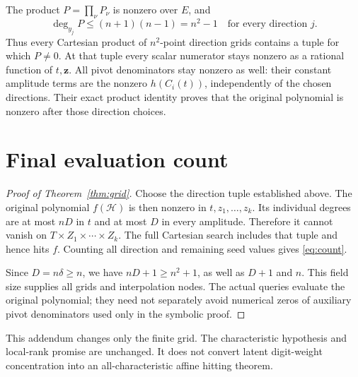 \documentclass[11pt]{article}
\begin{document}
The product \(P=\prod_\nu P_\nu\) is nonzero over \(E\), and
\[
 \deg_{y_j}P\le(n+1)(n-1)=n^2-1
 \quad\text{for every direction }j.
\]
Thus every Cartesian product of \(n^2\)-point direction grids
contains a tuple for which \(P\ne0\).
At that tuple every scalar numerator stays nonzero as a rational
function of \(t,\boldsymbol z\).
All pivot denominators stay nonzero as well: their constant
amplitude terms are the nonzero \(h(C_i(t))\), independently
of the chosen directions.
Their exact product identity proves that the original polynomial
is nonzero after those direction choices.

\section{Final evaluation count}

\begin{proof}[Proof of Theorem~\ref{thm:grid}]
Choose the direction tuple established above.
The original polynomial \(f(\mathcal H)\) is then nonzero in
\(t,z_1,\ldots,z_k\).
Its individual degrees are at most \(nD\) in \(t\) and at most
\(D\) in every amplitude. Therefore it cannot vanish on
\(T\times Z_1\times\cdots\times Z_k\).
The full Cartesian search includes that tuple and hence hits \(f\).
Counting all direction and remaining seed values gives
\eqref{eq:count}.

Since \(D=n\delta\ge n\), we have \(nD+1\ge n^2+1\), as well
as \(D+1\) and \(n\). This field size supplies all grids and
interpolation nodes.
The actual queries evaluate the original polynomial; they need
not separately avoid numerical zeros of auxiliary pivot
denominators used only in the symbolic proof.
\end{proof}

This addendum changes only the finite grid. The characteristic
hypothesis and local-rank promise are unchanged.
It does not convert latent digit-weight concentration into an
all-characteristic affine hitting theorem.
\end{document}
